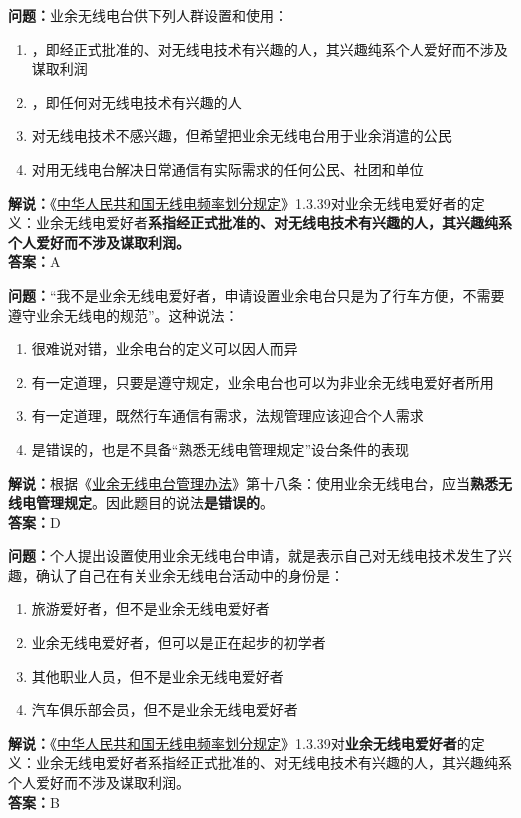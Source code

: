\textbf{问题：}业余无线电台供下列人群设置和使用：
\begin{enumerate}[label=\Alph*), leftmargin=1cm]
	\item ，即经正式批准的、对无线电技术有兴趣的人，其兴趣纯系个人爱好而不涉及谋取利润
	\item ，即任何对无线电技术有兴趣的人
	\item 对无线电技术不感兴趣，但希望把业余无线电台用于业余消遣的公民
	\item 对用无线电台解决日常通信有实际需求的任何公民、社团和单位
\end{enumerate}
\textbf{解说：}《\href{https://www.miit.gov.cn/zwgk/zcwj/wjfb/txy/art/2020/art_066386284cd2449493586c81ccafed11.html}{中华人民共和国无线电频率划分规定}》1.3.39对业余无线电爱好者的定义：业余无线电爱好者\textbf{系指经正式批准的、对无线电技术有兴趣的人，其兴趣纯系个人爱好而不涉及谋取利润。}\\\textbf{答案：}A


\textbf{问题：}“我不是业余无线电爱好者，申请设置业余电台只是为了行车方便，不需要遵守业余无线电的规范”。这种说法：
\begin{enumerate}[label=\Alph*), leftmargin=1cm]
	\item 很难说对错，业余电台的定义可以因人而异
	\item 有一定道理，只要是遵守规定，业余电台也可以为非业余无线电爱好者所用
	\item 有一定道理，既然行车通信有需求，法规管理应该迎合个人需求
	\item 是错误的，也是不具备“熟悉无线电管理规定”设台条件的表现
\end{enumerate}
\textbf{解说：}根据《\href{https://www.miit.gov.cn/jgsj/zfs/bmgz/art/2020/art_147b69815b3641caad9047735f94c860.html}{业余无线电台管理办法}》第十八条：使用业余无线电台，应当\textbf{熟悉无线电管理规定}。因此题目的说法\textbf{是错误的}。\\\textbf{答案：}D


\textbf{问题：}个人提出设置使用业余无线电台申请，就是表示自己对无线电技术发生了兴趣，确认了自己在有关业余无线电台活动中的身份是：
\begin{enumerate}[label=\Alph*), leftmargin=1cm]
	\item 旅游爱好者，但不是业余无线电爱好者
	\item 业余无线电爱好者，但可以是正在起步的初学者
	\item 其他职业人员，但不是业余无线电爱好者
	\item 汽车俱乐部会员，但不是业余无线电爱好者
\end{enumerate}
\textbf{解说：}《\href{https://www.miit.gov.cn/zwgk/zcwj/wjfb/txy/art/2020/art_066386284cd2449493586c81ccafed11.html}{中华人民共和国无线电频率划分规定}》1.3.39对\textbf{业余无线电爱好者}的定义：业余无线电爱好者系指经正式批准的、对无线电技术有兴趣的人，其兴趣纯系个人爱好而不涉及谋取利润。\\\textbf{答案：}B


